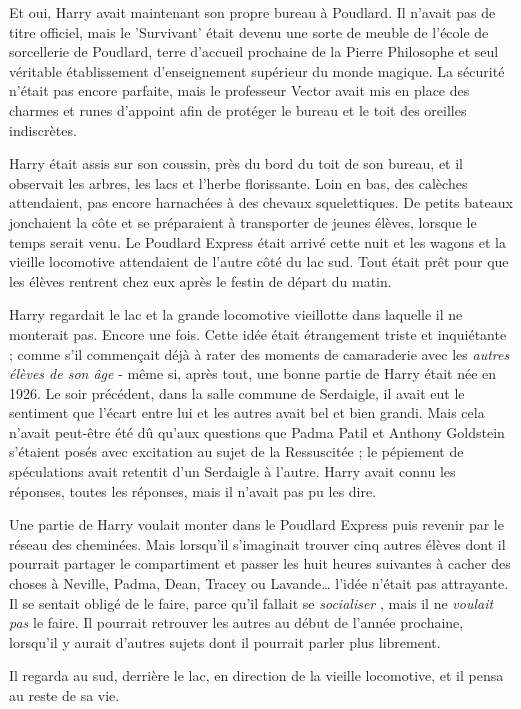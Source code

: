 Et oui, Harry avait maintenant son propre bureau à Poudlard. Il n'avait pas de titre officiel, mais le 'Survivant' était devenu une sorte de meuble de l'école de sorcellerie de Poudlard, terre d'accueil prochaine de la Pierre Philosophe et seul véritable établissement d'enseignement supérieur du monde magique. La sécurité n'était pas encore parfaite, mais le professeur Vector avait mis en place des charmes et runes d'appoint afin de protéger le bureau et le toit des oreilles indiscrètes.

Harry était assis sur son coussin, près du bord du toit de son bureau, et il observait les arbres, les lacs et l'herbe florissante. Loin en bas, des calèches attendaient, pas encore harnachées à des chevaux squelettiques. De petits bateaux jonchaient la côte et se préparaient à transporter de jeunes élèves, lorsque le temps serait venu. Le Poudlard Express était arrivé cette nuit et les wagons et la vieille locomotive attendaient de l'autre côté du lac sud. Tout était prêt pour que les élèves rentrent chez eux après le festin de départ du matin.

Harry regardait le lac et la grande locomotive vieillotte dans laquelle il ne monterait pas. Encore une fois. Cette idée était étrangement triste et inquiétante ; comme s'il commençait déjà à rater des moments de camaraderie avec les \emph{autres élèves de son âge}  - même si, après tout, une bonne partie de Harry était née en 1926. Le soir précédent, dans la salle commune de Serdaigle, il avait eut le sentiment que l'écart entre lui et les autres avait bel et bien grandi. Mais cela n'avait peut-être été dû qu'aux questions que Padma Patil et Anthony Goldstein s'étaient posés avec excitation au sujet de la Ressuscitée ; le pépiement de spéculations avait retentit d'un Serdaigle à l'autre. Harry avait connu les réponses, toutes les réponses, mais il n'avait pas pu les dire.

Une partie de Harry voulait monter dans le Poudlard Express puis revenir par le réseau des cheminées. Mais lorsqu'il s'imaginait trouver cinq autres élèves dont il pourrait partager le compartiment et passer les huit heures suivantes à cacher des choses à Neville, Padma, Dean, Tracey ou Lavande… l'idée n'était pas attrayante. Il se sentait obligé de le faire, parce qu'il fallait se \emph{socialiser} , mais il ne \emph{voulait pas}  le faire. Il pourrait retrouver les autres au début de l'année prochaine, lorsqu'il y aurait d'autres sujets dont il pourrait parler plus librement.

Il regarda au sud, derrière le lac, en direction de la vieille locomotive, et il pensa au reste de sa vie.

